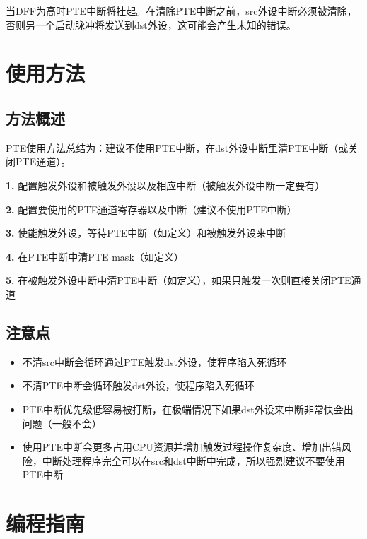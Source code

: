 \documentclass[
  12pt,
]{book}
\begin{document}
当DFF为高时PTE中断将挂起。在清除PTE中断之前，src外设中断必须被清除，否则另一个启动脉冲将发送到dst外设，这可能会产生未知的错误。

\hypertarget{ux4f7fux7528ux65b9ux6cd5-3}{%
\section{使用方法}\label{ux4f7fux7528ux65b9ux6cd5-3}}

\hypertarget{ux65b9ux6cd5ux6982ux8ff0-3}{%
\subsection{方法概述}\label{ux65b9ux6cd5ux6982ux8ff0-3}}

PTE使用方法总结为：建议不使用PTE中断，在dst外设中断里清PTE中断（或关闭PTE通道）。

\textbf{1.} 配置触发外设和被触发外设以及相应中断（被触发外设中断一定要有）

\textbf{2.} 配置要使用的PTE通道寄存器以及中断（建议不使用PTE中断）

\textbf{3.} 使能触发外设，等待PTE中断（如定义）和被触发外设来中断

\textbf{4.} 在PTE中断中清PTE mask（如定义）

\textbf{5.} 在被触发外设中断中清PTE中断（如定义），如果只触发一次则直接关闭PTE通道

\hypertarget{ux6ce8ux610fux70b9-3}{%
\subsection{注意点}\label{ux6ce8ux610fux70b9-3}}

\begin{itemize}
\item
  不清src中断会循环通过PTE触发dst外设，使程序陷入死循环
\item
  不清PTE中断会循环触发dst外设，使程序陷入死循环
\item
  PTE中断优先级低容易被打断，在极端情况下如果dst外设来中断非常快会出问题（一般不会）
\item
  使用PTE中断会更多占用CPU资源并增加触发过程操作复杂度、增加出错风险，中断处理程序完全可以在src和dst中断中完成，所以强烈建议不要使用PTE中断
\end{itemize}

\hypertarget{ux7f16ux7a0bux6307ux5357-3}{%
\section{编程指南}\label{ux7f16ux7a0bux6307ux5357-3}}
\end{document}
